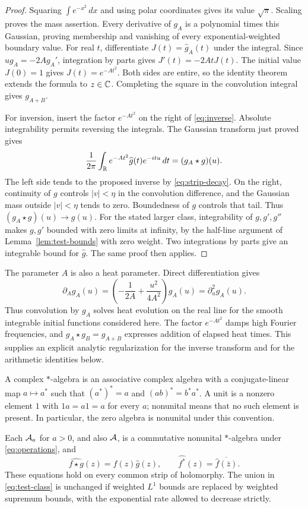 \begin{proof}
Squaring $\int e^{-x^2}\,dx$ and using polar coordinates gives its value
$\sqrt\pi$.  Scaling proves the mass assertion.
Every derivative of $g_A$ is a polynomial times this Gaussian, proving
membership and vanishing of every exponential-weighted boundary value.
For real $t$, differentiate $J(t)=\widehat g_A(t)$ under the integral.
Since $u g_A=-2A g_A'$, integration by parts gives
$J'(t)=-2AtJ(t)$.  The initial value $J(0)=1$ gives $J(t)=e^{-At^2}$.
Both sides are entire, so the identity theorem extends the formula to $z\in\mathbb C$.
Completing the square in the convolution integral gives $g_{A+B}$.

For inversion, insert the factor $e^{-At^2}$ on the right of
\eqref{eq:inverse}.  Absolute integrability permits reversing the integrals.
The Gaussian transform just proved gives
\[
 \frac1{2\pi}\int_{\mathbb R}e^{-At^2}\widehat g(t)e^{-itu}\,dt
       =(g_A\star g)(u).
\]
The left side tends to the proposed inverse by \eqref{eq:strip-decay}.
On the right, continuity of $g$ controls $|v|<\eta$ in the convolution
difference, and the Gaussian mass outside $|v|<\eta$ tends to zero.
Boundedness of $g$ controls that tail.  Thus $(g_A\star g)(u)\to g(u)$.
For the stated larger class, integrability of $g,g',g''$ makes $g,g'$
bounded with zero limits at infinity, by the half-line argument of
Lemma~\ref{lem:test-bounds} with zero weight.
Two integrations by parts give an integrable bound for $\widehat g$.
The same proof then applies.
\end{proof}

The parameter $A$ is also a heat parameter.  Direct differentiation gives
\[
 \partial_A g_A(u)=\left(-\frac1{2A}+\frac{u^2}{4A^2}\right)g_A(u)
                  =\partial_u^2g_A(u).
\]
Thus convolution by $g_A$ solves heat evolution on the real line for the
smooth integrable initial functions considered here.
The factor $e^{-At^2}$ damps high Fourier frequencies, and
$g_A\star g_B=g_{A+B}$ expresses addition of elapsed heat times.
This supplies an explicit analytic regularization for the inverse transform
and for the arithmetic identities below.

A complex $*$-algebra is an associative complex algebra with a conjugate-linear
map $a\mapsto a^*$ such that $(a^*)^*=a$ and $(ab)^*=b^*a^*$.
A unit is a nonzero element $1$ with $1a=a1=a$ for every $a$;
nonunital means that no such element is present.
In particular, the zero algebra is nonunital under this convention.

\begin{proposition}
\label{prop:algebra}
Each $\mathcal A_a$ for $a>0$, and also $\mathcal A$, is a commutative nonunital
$*$-algebra under \eqref{eq:operations}, and
\begin{equation}
 \widehat{f\star g}(z)=\widehat f(z)\widehat g(z),\qquad
 \widehat{f^*}(z)=\overline{\widehat f(\bar z)}.
 \label{eq:star-transform}
\end{equation}
These equations hold on every common strip of holomorphy.
The union in \eqref{eq:test-class} is unchanged if weighted $L^1$ bounds
are replaced by weighted supremum bounds, with the exponential rate allowed
to decrease strictly.
\end{proposition}

